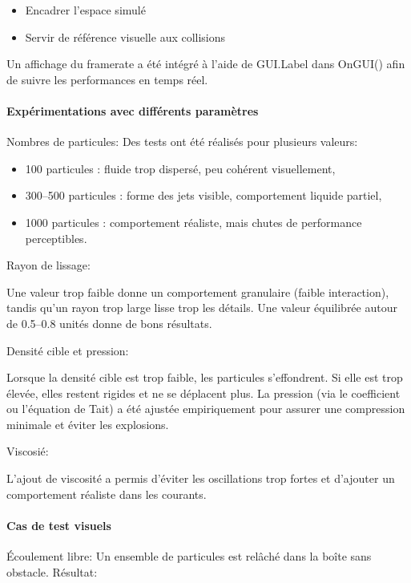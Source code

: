\documentclass{article}
\begin{document}
\begin{itemize}
    \item Encadrer l’espace simulé
    \item Servir de référence visuelle aux collisions
\end{itemize}

Un affichage du framerate a été intégré à l’aide de GUI.Label dans OnGUI() afin de suivre les performances en temps réel.

\paragraph{ Expérimentations avec différents paramètres}

Nombres de particules: Des tests ont été réalisés pour plusieurs valeurs:

\begin{itemize}
    \item 100 particules : fluide trop dispersé, peu cohérent visuellement,
    \item 300–500 particules : forme des jets visible, comportement liquide partiel,
    \item 1000 particules : comportement réaliste, mais chutes de performance perceptibles.
\end{itemize}

Rayon de lissage:

Une valeur trop faible donne un comportement granulaire (faible interaction), tandis qu’un rayon trop large lisse trop les détails. Une valeur équilibrée autour de 0.5–0.8 unités donne de bons résultats.

Densité cible et pression:

Lorsque la densité cible est trop faible, les particules s'effondrent. Si elle est trop élevée, elles restent rigides et ne se déplacent plus. La pression (via le coefficient ou l’équation de Tait) a été ajustée empiriquement pour assurer une compression minimale et éviter les explosions.

Viscosié:

L'ajout de viscosité a permis d'éviter les oscillations trop fortes et d’ajouter un comportement réaliste dans les courants.

\paragraph{Cas de test visuels}

Écoulement libre: Un ensemble de particules est relâché dans la boîte sans obstacle. Résultat:
\end{document}
